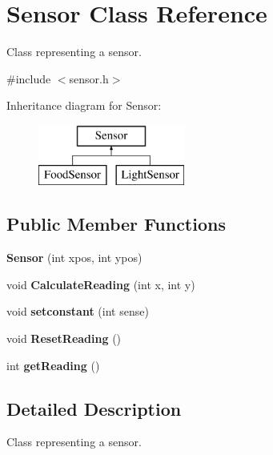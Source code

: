 \hypertarget{class_sensor}{}\section{Sensor Class Reference}
\label{class_sensor}


Class representing a sensor.  




{\ttfamily \#include $<$sensor.\+h$>$}

Inheritance diagram for Sensor\+:\begin{figure}[H]
\begin{center}
\leavevmode
\includegraphics[height=2.000000cm]{class_sensor}
\end{center}
\end{figure}
\subsection*{Public Member Functions}
\begin{DoxyCompactItemize}
\item 
\mbox{\label{class_sensor_a8b559df119764bb2f85d72116dacdb71}} 
{\bfseries Sensor} (int xpos, int ypos)
\item 
\mbox{\label{class_sensor_a7bcda7b39b3c738116cdbbe2a45f9ed0}} 
void {\bfseries Calculate\+Reading} (int x, int y)
\item 
\mbox{\label{class_sensor_a01eeddbc642c27e3aeb232d2a15c4a75}} 
void {\bfseries setconstant} (int sense)
\item 
\mbox{\label{class_sensor_a6cde7ca5e60c12b56cb87a9859991de2}} 
void {\bfseries Reset\+Reading} ()
\item 
\mbox{\label{class_sensor_a33dde25c2a380263305ebef3e158f5b0}} 
int {\bfseries get\+Reading} ()
\end{DoxyCompactItemize}


\subsection{Detailed Description}
Class representing a sensor. 

